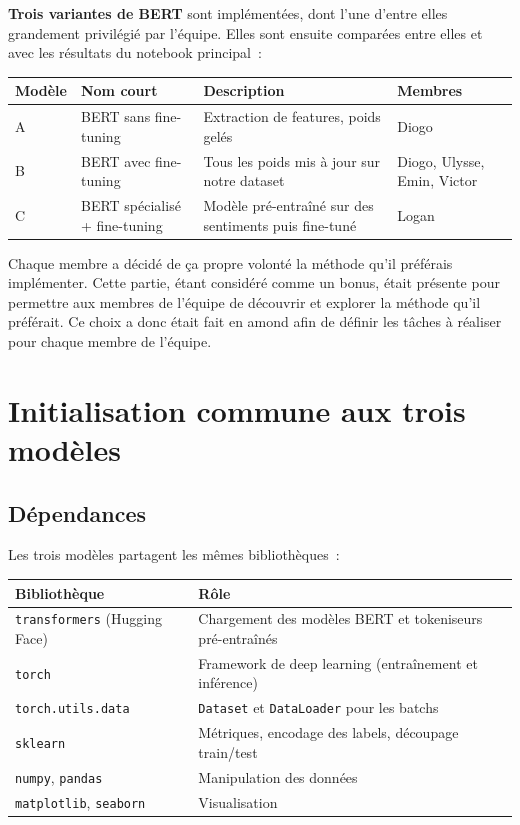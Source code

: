 \documentclass[12pt,a4paper]{report}
\begin{document}
\textbf{Trois variantes de BERT} sont implémentées, dont l'une d'entre elles grandement privilégié par l'équipe. 
Elles sont ensuite comparées entre elles et avec les résultats du notebook principal~:

\begin{center}
\begin{tabular}{@{}llL{4cm}L{3cm}@{}}
  \toprule
  Modèle & Nom court & Description & Membres \\
  \midrule
  A & BERT sans fine-tuning & Extraction de features, poids gelés & Diogo \\
  B & BERT avec fine-tuning & Tous les poids mis à jour sur notre dataset & Diogo, Ulysse, Emin, Victor \\
  C & BERT spécialisé + fine-tuning & Modèle pré-entraîné sur des sentiments puis fine-tuné & Logan \\
  \bottomrule
\end{tabular}
\end{center}

\begin{note}[Remarque]
Chaque membre a décidé de ça propre volonté la méthode qu'il préférais implémenter. 
Cette partie, étant considéré comme un bonus, était présente pour permettre aux membres de l'équipe de découvrir et explorer la méthode qu'il préférait.
Ce choix a donc était fait en amond afin de définir les tâches à réaliser pour chaque membre de l'équipe.
\end{note}

\pagebreak

\section{Initialisation commune aux trois modèles}

\subsection{Dépendances}

Les trois modèles partagent les mêmes bibliothèques~:

\begin{center}
\begin{tabular}{@{}lL{9cm}@{}}
  \toprule
  Bibliothèque & Rôle \\
  \midrule
  \texttt{transformers} (Hugging Face) & Chargement des modèles BERT et tokeniseurs pré-entraînés \\
  \texttt{torch} & Framework de deep learning (entraînement et inférence) \\
  \texttt{torch.utils.data} & \texttt{Dataset} et \texttt{DataLoader} pour les batchs \\
  \texttt{sklearn} & Métriques, encodage des labels, découpage train/test \\
  \texttt{numpy}, \texttt{pandas} & Manipulation des données \\
  \texttt{matplotlib}, \texttt{seaborn} & Visualisation \\
  \bottomrule
\end{tabular}
\end{center}
\end{document}
